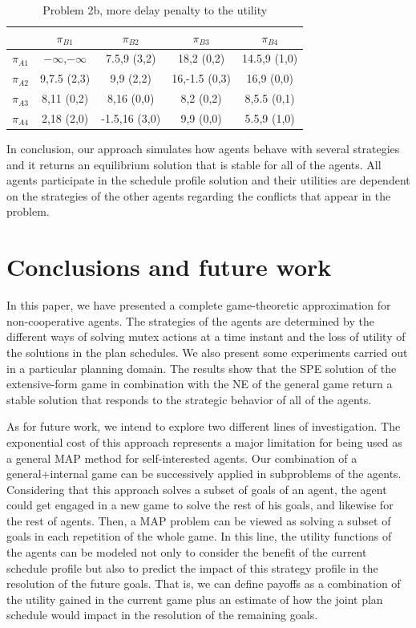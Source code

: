 \documentclass[letterpaper]{article}
\begin{document}
\begin{table}[ht]
\centering \scriptsize
\begin{tabular}{|l|c|c|c|c|}
 \hline

	&  $\pi_{B1}$ & $\pi_{B2}$ &  $\pi_{B3}$ & $\pi_{B4}$\\ \hline
$\pi_{A1}$ &  $-\infty$,$-\infty$ &  7.5,9 (3,2)  & 18,2 (0,2) & 14.5,9 (1,0) \\ \hline
$\pi_{A2}$  & 9,7.5 (2,3) & 9,9 (2,2) & 16,-1.5 (0,3) & 16,9 (0,0) \\ \hline
$\pi_{A3}$ &  8,11 (0,2)&  8,16 (0,0) & 8,2 (0,2) & 8,5.5 (0,1) \\ \hline
$\pi_{A4}$ &  2,18 (2,0)&  -1.5,16 (3,0) & 9,9 (0,0) & 5.5,9 (1,0) \\ \hline


\end{tabular}
\caption{Problem 2b, more delay penalty to the utility}
\label{tab:prob2b}
\end{table}


In conclusion, our approach simulates how agents behave with several strategies and it returns an equilibrium solution that is stable for all of the agents. All agents participate in the schedule profile solution and their utilities are dependent on the strategies of the other agents regarding the conflicts that appear in the problem.


\section{Conclusions and future work}

In this paper, we have presented a complete game-theoretic approximation for non-cooperative agents. The strategies of the agents are determined by the different ways of solving mutex actions at a time instant and the loss of utility of the solutions in the plan schedules. We also present some experiments carried out in a particular planning domain. The results show that the SPE solution of the extensive-form game in combination with the NE of the general game return a stable solution that responds to the strategic behavior of all of the agents.

As for future work, we intend to explore two different lines of investigation. The exponential cost of this approach represents a major limitation for being used as a general MAP method for self-interested agents. Our combination of a general+internal game can be successively applied in subproblems of the agents. Considering that this approach solves a subset of goals of an agent, the agent could get engaged in a new game to solve the rest of his goals, and likewise for the rest of agents. Then, a MAP problem can be viewed as solving a subset of goals in each repetition of the whole game. In this line, the utility functions of the agents can be modeled not only to consider the benefit of the current schedule profile but also to predict the impact of this strategy profile in the resolution of the future goals. That is, we can define payoffs as a combination of the utility gained in the current game plus an estimate of how the joint plan schedule would impact in the resolution of the remaining goals.
\end{document}
